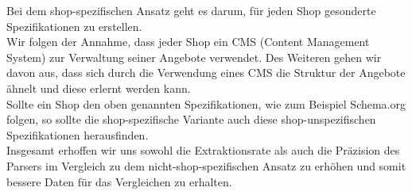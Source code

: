 Bei dem shop-spezifischen Ansatz geht es darum, für jeden Shop gesonderte Spezifikationen zu erstellen. \\
Wir folgen der Annahme, dass jeder Shop ein CMS (Content Management System) zur Verwaltung seiner Angebote verwendet.
Des Weiteren gehen wir davon aus, dass sich durch die Verwendung eines CMS die Struktur der Angebote ähnelt und diese
erlernt werden kann.\\
Sollte ein Shop den oben genannten Spezifikationen, wie zum Beispiel Schema.org folgen, so sollte die
shop-spezifische Variante auch diese shop-unspezifischen Spezifikationen herausfinden.\\
Insgesamt erhoffen wir uns sowohl die Extraktionsrate als auch die Präzision des Parsers im Vergleich zu dem
nicht-shop-spezifischen Ansatz zu erhöhen und somit bessere Daten für das Vergleichen zu erhalten.